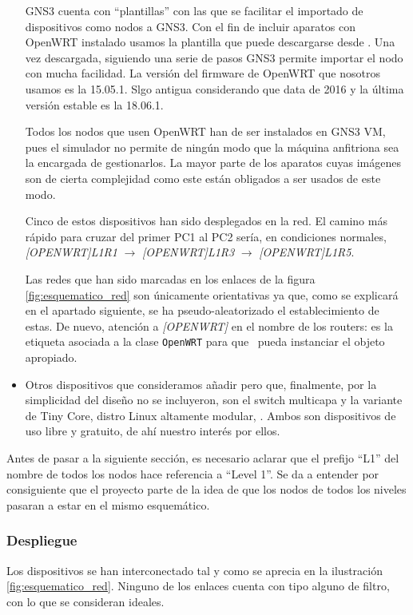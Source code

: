 \begin{itemize}
GNS3 cuenta con ``plantillas'' con las que se facilitar el importado de dispositivos como nodos a GNS3. Con el fin de incluir aparatos con OpenWRT instalado usamos la plantilla que puede descargarse desde . Una vez descargada, siguiendo una serie de pasos GNS3 permite importar el nodo con mucha facilidad. La versión del firmware de OpenWRT que nosotros usamos es la 15.05.1. Slgo antigua considerando que data de 2016 y la última versión estable es la 18.06.1.

Todos los nodos que usen OpenWRT han de ser instalados en GNS3 VM, pues el simulador no permite de ningún modo que la máquina anfitriona sea la encargada de gestionarlos. La mayor parte de los aparatos cuyas imágenes son de cierta complejidad como este están obligados a ser usados de este modo.

Cinco de estos dispositivos han sido desplegados en la red. El camino más rápido para cruzar del primer PC1 al PC2 sería, en condiciones normales, \textit{[OPENWRT]L1R1} $\rightarrow$ \textit{[OPENWRT]L1R3} $\rightarrow$ \textit{[OPENWRT]L1R5}.

Las redes que han sido marcadas en los enlaces de la figura \ref{fig:esquematico_red} son únicamente orientativas ya que, como se explicará en el apartado siguiente, se ha pseudo-aleatorizado el establecimiento de estas. De nuevo, atención a \textit{[OPENWRT]} en el nombre de los routers: es la etiqueta asociada a la clase \texttt{OpenWRT} para que \GNSCS~pueda instanciar el objeto apropiado.

\item Otros dispositivos que consideramos añadir pero que, finalmente, por la simplicidad del diseño no se incluyeron, son el switch multicapa  y la variante de Tiny Core, distro Linux altamente modular, . Ambos son dispositivos de uso libre y gratuito, de ahí nuestro interés por ellos.
\end{itemize}

Antes de pasar a la siguiente sección, es necesario aclarar que el prefijo ``L1'' del nombre de todos los nodos hace referencia a ``Level 1''. Se da a entender por consiguiente que el proyecto parte de la idea de que los nodos de todos los niveles pasaran a estar en el mismo esquemático.

\subsubsection{Despliegue}
Los dispositivos se han interconectado tal y como se aprecia en la ilustración \ref{fig:esquematico_red}. Ninguno de los enlaces cuenta con tipo alguno de filtro, con lo que se consideran ideales.

